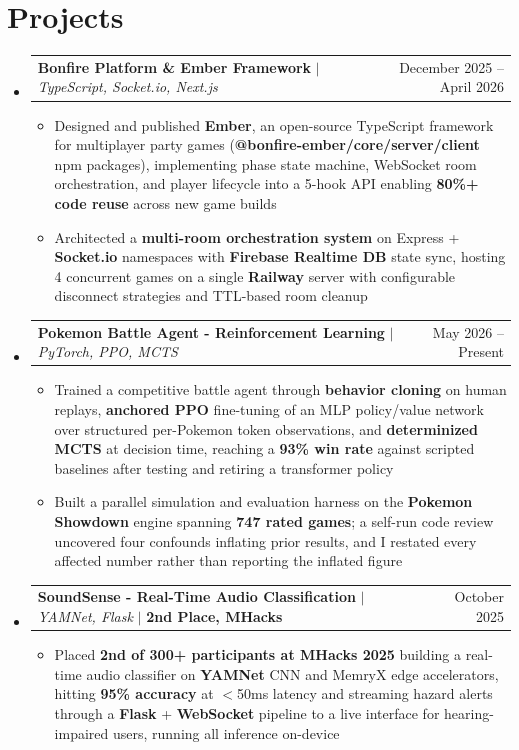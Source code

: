 \documentclass[letterpaper,11pt]{article}
\makeatletter
\newcommand{\resumeItem}[1]{
  \item\small{
    {#1 \vspace{-2pt}}
  }
}
\newcommand{\resumeProjectHeading}[2]{
    \item
    \begin{tabular*}{0.97\textwidth}{l@{\extracolsep{\fill}}r}
      \small#1 & #2 \\
    \end{tabular*}\vspace{-7pt}
}
\newcommand{\resumeSubHeadingListStart}{\begin{itemize}[leftmargin=0.15in, label={}]}
\newcommand{\resumeSubHeadingListEnd}{\end{itemize}}
\newcommand{\resumeItemListStart}{\begin{itemize}}
\newcommand{\resumeItemListEnd}{\end{itemize}\vspace{-5pt}}
\makeatother
\begin{document}
\section{Projects}
    \resumeSubHeadingListStart
      \resumeProjectHeading
          {\textbf{Bonfire Platform \& Ember Framework} $|$ \emph{TypeScript, Socket.io, Next.js}}{December 2025 -- April 2026}
          \resumeItemListStart
            \resumeItem{Designed and published \textbf{Ember}, an open-source TypeScript framework for multiplayer party games (\textbf{@bonfire-ember/core/server/client} npm packages), implementing phase state machine, WebSocket room orchestration, and player lifecycle into a 5-hook API enabling \textbf{80\%+ code reuse} across new game builds}
            \resumeItem{Architected a \textbf{multi-room orchestration system} on Express + \textbf{Socket.io} namespaces with \textbf{Firebase Realtime DB} state sync, hosting 4 concurrent games on a single \textbf{Railway} server with configurable disconnect strategies and TTL-based room cleanup}
          \resumeItemListEnd
      \resumeProjectHeading
          {\textbf{Pokemon Battle Agent - Reinforcement Learning} $|$ \emph{PyTorch, PPO, MCTS}}{May 2026 -- Present}
          \resumeItemListStart
            \resumeItem{Trained a competitive battle agent through \textbf{behavior cloning} on human replays, \textbf{anchored PPO} fine-tuning of an MLP policy/value network over structured per-Pokemon token observations, and \textbf{determinized MCTS} at decision time, reaching a \textbf{93\% win rate} against scripted baselines after testing and retiring a transformer policy}
            \resumeItem{Built a parallel simulation and evaluation harness on the \textbf{Pokemon Showdown} engine spanning \textbf{747 rated games}; a self-run code review uncovered four confounds inflating prior results, and I restated every affected number rather than reporting the inflated figure}
          \resumeItemListEnd
      \resumeProjectHeading
          {\textbf{SoundSense - Real-Time Audio Classification} $|$ \emph{YAMNet, Flask} $|$ \textbf{2nd Place, MHacks}}{October 2025}
          \resumeItemListStart
            \resumeItem{Placed \textbf{2nd of 300+ participants at MHacks 2025} building a real-time audio classifier on \textbf{YAMNet} CNN and MemryX edge accelerators, hitting \textbf{95\% accuracy} at $<$50ms latency and streaming hazard alerts through a \textbf{Flask} + \textbf{WebSocket} pipeline to a live interface for hearing-impaired users, running all inference on-device}
          \resumeItemListEnd
    \resumeSubHeadingListEnd
\end{document}
